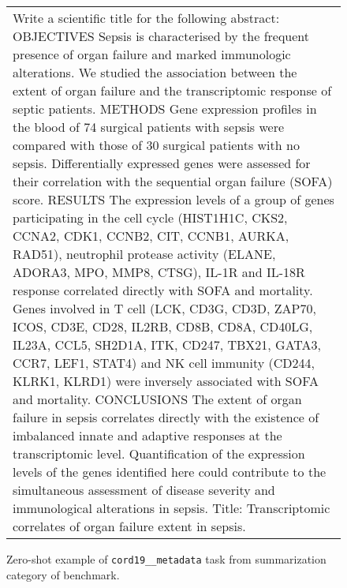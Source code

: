 \begin{figure}[h]
\centering
\begin{tabular}{p{}}
\cellcolor{oldlace} Write a scientific title for the following abstract: OBJECTIVES Sepsis is characterised by the frequent presence of organ failure and marked immunologic alterations. We studied the association between the extent of organ failure and the transcriptomic response of septic patients. METHODS Gene expression profiles in the blood of 74 surgical patients with sepsis were compared with those of 30 surgical patients with no sepsis. Differentially expressed genes were assessed for their correlation with the sequential organ failure (SOFA) score. RESULTS The expression levels of a group of genes participating in the cell cycle (HIST1H1C, CKS2, CCNA2, CDK1, CCNB2, CIT, CCNB1, AURKA, RAD51), neutrophil protease activity (ELANE, ADORA3, MPO, MMP8, CTSG), IL-1R and IL-18R response correlated directly with SOFA and mortality. Genes involved in T cell (LCK, CD3G, CD3D, ZAP70, ICOS, CD3E, CD28, IL2RB, CD8B, CD8A, CD40LG, IL23A, CCL5, SH2D1A, ITK, CD247, TBX21, GATA3, CCR7, LEF1, STAT4) and NK cell immunity (CD244, KLRK1, KLRD1) were inversely associated with SOFA and mortality. CONCLUSIONS The extent of organ failure in sepsis correlates directly with the existence of imbalanced innate and adaptive responses at the transcriptomic level. Quantification of the expression levels of the genes identified here could contribute to the simultaneous assessment of disease severity and immunological alterations in sepsis.\vspace{1pt} \newline Title: \textcolor{cadmiumgreen}{Transcriptomic correlates of organ failure extent in sepsis.} \\
\end{tabular}
\caption{Zero-shot example of \texttt{cord19\_\_metadata} task from summarization category of \promptsource benchmark.}
\end{figure}




